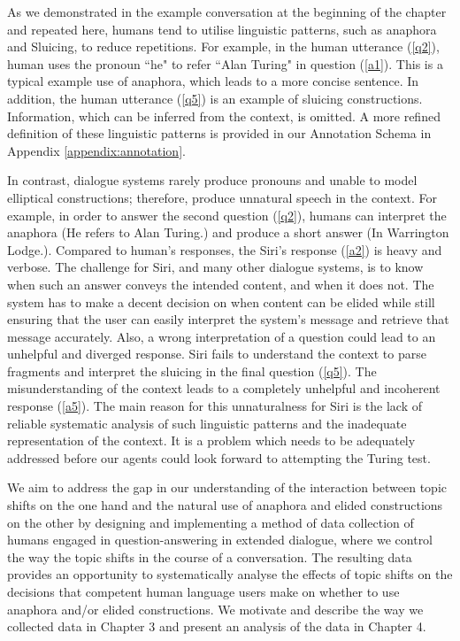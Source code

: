 \documentclass[bsc,frontabs,twoside,singlespacing,parskip,deptreport]{infthesis}     %
\begin{document}
As we demonstrated in the example conversation at the beginning of the chapter and repeated here, humans tend to utilise linguistic patterns, such as anaphora and Sluicing, to reduce repetitions. For example, in the human utterance (\ref{q2}), human uses the pronoun ``he" to refer ``Alan Turing" in question (\ref{a1}). This is a typical example use of anaphora, which leads to a more concise sentence. In addition, the human utterance (\ref{q5}) is an example of sluicing constructions. Information, which can be inferred from the context, is omitted. A more refined definition of these linguistic patterns is provided in our Annotation Schema in Appendix \ref{appendix:annotation}.

In contrast, dialogue systems rarely produce pronouns and unable to model elliptical constructions; therefore, produce unnatural speech in the context. For example, in order to answer the second question (\ref{q2}), humans can interpret the anaphora (He refers to Alan Turing.) and produce a short answer (In Warrington Lodge.). Compared to human's responses, the Siri's response (\ref{a2}) is heavy and verbose. The challenge for Siri, and many other dialogue systems, is to know when such an answer conveys the intended content, and when it does not. The system has to make a decent decision on when content can be elided while still ensuring that the user can easily interpret the system's message and retrieve that message accurately. Also, a wrong interpretation of a question could lead to an unhelpful and diverged response. Siri fails to understand the context to parse fragments and interpret the sluicing in the final question (\ref{q5}). The misunderstanding of the context leads to a completely unhelpful and incoherent response (\ref{a5}). The main reason for this unnaturalness for Siri is the lack of reliable systematic analysis of such linguistic patterns and the inadequate representation of the context. It is a problem which needs to be adequately addressed before our agents could look forward to attempting the Turing test.

We aim to address the gap in our understanding of the interaction between topic shifts on the one hand and the natural use of anaphora and elided constructions on the other by designing and implementing a method of data collection of humans engaged in question-answering in extended dialogue, where we control the way the topic shifts in the course of a conversation. The resulting data provides an opportunity to systematically analyse the effects of topic shifts on the decisions that competent human language users make on whether to use anaphora and/or elided constructions. We motivate and describe the way we collected data in Chapter 3 and present an analysis of the data in Chapter 4.
\end{document}
